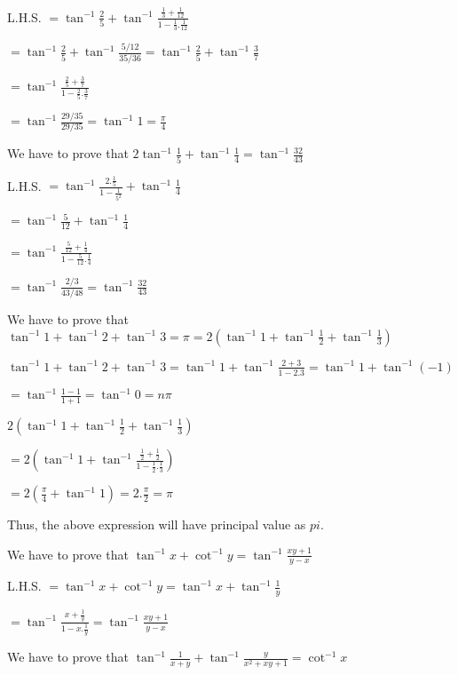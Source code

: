   L.H.S. $= \tan^{-1}\frac{2}{5} + \tan^{-1}\frac{\frac{1}{3} + \frac{1}{12}}{1 - \frac{1}{3}.\frac{1}{12}}$

  $= \tan^{-1}\frac{2}{5} + \tan^{-1}\frac{5/12}{35/36} = \tan^{-1}\frac{2}{5} + \tan^{-1}\frac{3}{7}$

  $= \tan^{-1}\frac{\frac{2}{5} + \frac{3}{7}}{1 - \frac{2}{5}.\frac{3}{7}}$

  $= \tan^{-1}\frac{29/35}{29/35} = \tan^{-1}1 = \frac{\pi}{4}$

\item We have to prove that $2\tan^{-1}\frac{1}{5} + \tan^{-1}\frac{1}{4} = \tan^{-1}\frac{32}{43}$

  L.H.S. $= \tan^{-1}\frac{2.\frac{1}{5}}{1 - \frac{1}{5^2}} + \tan^{-1}\frac{1}{4}$

  $= \tan^{-1}\frac{5}{12} + \tan^{-1}\frac{1}{4}$

  $= \tan^{-1}\frac{\frac{5}{12} + \frac{1}{4}}{1 - \frac{5}{12}.\frac{1}{4}}$

  $= \tan^{-1}\frac{2/3}{43/48} = \tan^{-1}\frac{32}{43}$

\item We have to prove that $\tan^{-1}1 + \tan^{-1}2 + \tan^{-1}3 = \pi = 2\left(\tan^{-1}1 + \tan^{-1}\frac{1}{2} +
  \tan^{-1}\frac{1}{3}\right)$

  $\tan^{-1}1 + \tan^{-1}2 + \tan^{-1}3 = \tan^{-1}1 + \tan^{-1}\frac{2 + 3}{1 - 2.3} = \tan^{-1}1 + \tan^{-1}(-1)$

  $= \tan^{-1}\frac{1 - 1}{1 + 1} =\tan^{-1}0 = n\pi$

  $2\left(\tan^{-1}1 + \tan^{-1}\frac{1}{2} + \tan^{-1}\frac{1}{3}\right)$

  $= 2\left(\tan^{-1}1 + \tan^{-1}\frac{\frac{1}{2} + \frac{1}{2}}{1 - \frac{1}{2}.\frac{1}{3}}\right)$

  $= 2\left(\frac{\pi}{4} + \tan^{-1}1\right) = 2.\frac{\pi}{2} = \pi$

  Thus, the above expression will have principal value as $pi.$

\item We have to prove that $\tan^{-1}x + \cot^{-1}y = \tan^{-1}\frac{xy + 1}{y - x}$

  L.H.S. $= \tan^{-1}x + \cot^{-1}y = \tan^{-1}x + \tan^{-1}\frac{1}{y}$

  $= \tan^{-1}\frac{x + \frac{1}{y}}{1 - x.\frac{1}{y}} = \tan^{-1}\frac{xy + 1}{y - x}$

\item We have to prove that $\tan^{-1}\frac{1}{x + y} + \tan^{-1}\frac{y}{x^2 + xy + 1} = \cot^{-1}x$

